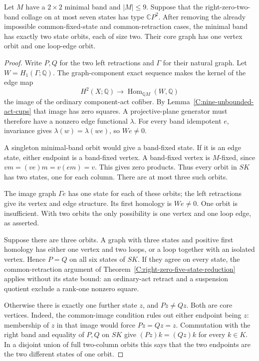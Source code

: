 \begin{lemma}
\label{C:seven-state-two-column-core}
Let $M$ have a $2\times2$ minimal band and $|M|\leq9$.
Suppose that the right-zero-two-band collage on at most
seven states has type $\mathbb CP^2$.  After removing the
already impossible common-fixed-state and common-retraction
cases, the minimal band has exactly two state orbits, each
of size two.  Their core graph has one vertex orbit and
one loop-edge orbit.
\end{lemma}
\begin{proof}
Write $P,Q$ for the two left retractions and $\Gamma$ for
their natural graph.  Let $W=H_1(\Gamma;\mathbb Q)$.
The graph-component exact sequence makes the kernel of
the edge map
\[
 H^2(X;\mathbb Q)\longrightarrow
 \operatorname{Hom}_{\mathbb QM}(W,\mathbb Q)
\]
the image of the ordinary component-act cofiber.
By Lemma~\ref{C:nine-unbounded-act-cups} that image has
zero squares.  A projective-plane generator must therefore
have a nonzero edge functional $\lambda$.
For every band idempotent $e$, invariance gives
$\lambda(w)=\lambda(we)$, so $We\ne0$.

A singleton minimal-band orbit would give a band-fixed
state.  If it is an edge state, either endpoint is a
band-fixed vertex.  A band-fixed vertex is $M$-fixed,
since $vm=(ve)m=v(em)=v$.  This gives zero products.
Thus every orbit in $SK$ has two states, one for each
column.  There are at most three such orbits.

The image graph $\Gamma e$ has one state for each of
these orbits; the left retractions give its vertex and
edge structure.  Its first homology is $We\ne0$.
One orbit is insufficient.  With two orbits the only
possibility is one vertex and one loop edge, as asserted.

Suppose there are three orbits.  A graph with three
states and positive first homology has either one vertex
and two loops, or a loop together with an isolated vertex.
Hence $P=Q$ on all six states of $SK$.
If they agree on every state, the common-retraction
argument of Theorem~\ref{C:right-zero-five-state-reduction}
applies without its state bound: an ordinary-act retract
and a suspension quotient exclude a rank-one nonzero
square.

Otherwise there is exactly one further state $z$, and
$Pz\ne Qz$.  Both are core vertices.  Indeed, the
common-image condition rules out either endpoint being
$z$: membership of $z$ in that image would force
$Pz=Qz=z$.  Commutation with
the right band and equality of $P,Q$ on $SK$ give
$(Pz)k=(Qz)k$ for every $k\in K$.  In a disjoint union
of full two-column orbits this says that the two endpoints
are the two different states of one orbit.


\end{proof}
